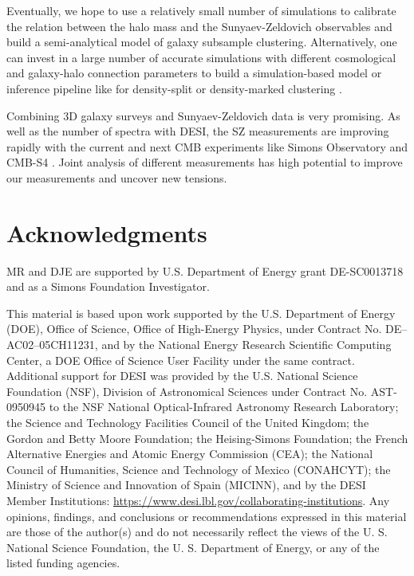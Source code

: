 Eventually, we hope to use a relatively small number of simulations to calibrate the relation between the halo mass and the Sunyaev-Zeldovich observables and build a semi-analytical model of galaxy subsample clustering.
Alternatively, one can invest in a large number of accurate simulations with different cosmological and galaxy-halo connection parameters to build a simulation-based model or inference pipeline like for density-split \citep{density-split-clustering-sim-based-model} or density-marked clustering \citep{density-marked-PS-SBI}.

Combining 3D galaxy surveys and Sunyaev-Zeldovich data is very promising.
As well as the number of spectra with DESI, the SZ measurements are improving rapidly with the current and next CMB experiments like Simons Observatory \citep{SO} and CMB-S4 \citep{CMBS4,CMBS4white}.
Joint analysis of different measurements has high potential to improve our measurements and uncover new tensions.

\section*{Acknowledgments}

MR and DJE are supported by U.S. Department of Energy grant DE-SC0013718 and as a Simons Foundation Investigator.

This material is based upon work supported by the U.S. Department of Energy (DOE), Office of Science, Office of High-Energy Physics, under Contract No. DE–AC02–05CH11231, and by the National Energy Research Scientific Computing Center, a DOE Office of Science User Facility under the same contract. Additional support for DESI was provided by the U.S. National Science Foundation (NSF), Division of Astronomical Sciences under Contract No. AST-0950945 to the NSF National Optical-Infrared Astronomy Research Laboratory; the Science and Technology Facilities Council of the United Kingdom; the Gordon and Betty Moore Foundation; the Heising-Simons Foundation; the French Alternative Energies and Atomic Energy Commission (CEA); the National Council of Humanities, Science and Technology of Mexico (CONAHCYT); the Ministry of Science and Innovation of Spain (MICINN), and by the DESI Member Institutions: \url{https://www.desi.lbl.gov/collaborating-institutions}. Any opinions, findings, and conclusions or recommendations expressed in this material are those of the author(s) and do not necessarily reflect the views of the U. S. National Science Foundation, the U. S. Department of Energy, or any of the listed funding agencies.

